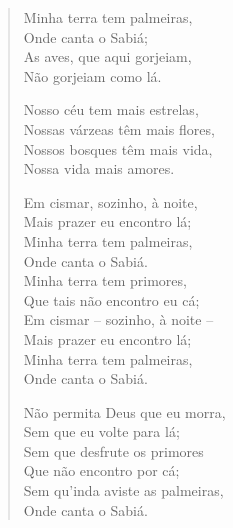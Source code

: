 \begin{verse}

Minha terra tem palmeiras, \\

Onde canta o Sabiá; \\

As aves, que aqui gorjeiam, \\

Não gorjeiam como lá. 


Nosso céu tem mais estrelas,\\

Nossas várzeas têm mais flores, \\

Nossos bosques têm mais vida, \\

Nossa vida mais amores.


Em cismar, sozinho, à noite, \\

Mais prazer eu encontro lá; \\

Minha terra tem palmeiras, \\

Onde canta o Sabiá. \\


Minha terra tem primores, \\

Que tais não encontro eu cá; \\

Em cismar -- sozinho, à noite -- \\

Mais prazer eu encontro lá; \\

Minha terra tem palmeiras, \\

Onde canta o Sabiá. 


Não permita Deus que eu morra, \\

Sem que eu volte para lá; \\

Sem que desfrute os primores \\

Que não encontro por cá; \\

Sem qu'inda aviste as palmeiras, \\

Onde canta o Sabiá.

\end{verse}

